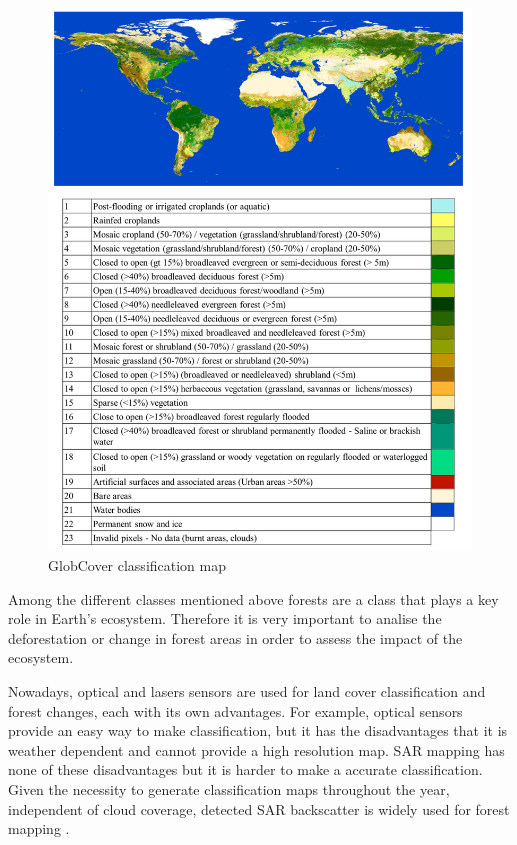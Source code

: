 \begin{figure}[H]
    \centering
    \includegraphics[width=\linewidth]{Cap2/glob_cover.png}
    \caption{GlobCover classification map}
    \label{fig:glob_cover_map}
\end{figure}

Among the different classes mentioned above forests are a class that plays a key role in Earth's ecosystem. Therefore it is very important to analise the deforestation or change in forest areas in order to assess the impact of the ecosystem. 

Nowadays, optical and lasers sensors are used for land cover classification and forest changes, each with its own advantages. For example, optical sensors provide an easy way to make classification, but it has the disadvantages that it is weather dependent and cannot provide a high resolution map. SAR mapping has none of these disadvantages but it is harder to make a accurate classification. Given the necessity to generate classification maps throughout the year, independent of cloud coverage, detected SAR backscatter is widely used for forest mapping \cite{Krieger}. 

